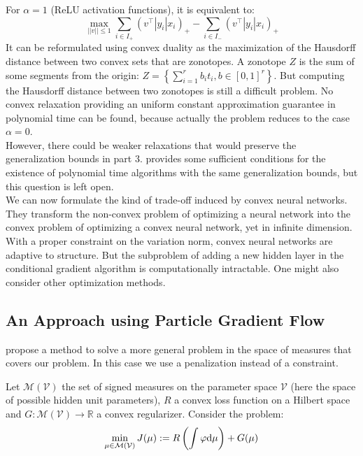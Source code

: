 \documentclass[a4paper, 11pt]{scrartcl}
\begin{document}
{For $\alpha = 1$ (ReLU activation functions), it is equivalent to:
\begin{equation}
\max_{||v|| \leq 1} \sum_{i\in I_+} (v^\top |y_i| x_i )_+  - \sum_{i\in I_-} (v^\top |y_i| x_i )_+
\end{equation}
It can be reformulated using convex duality as the maximization of the Hausdorff distance between two convex sets that are zonotopes. A zonotope $Z$ is the sum of some segments from the origin: $Z = \left\{ \sum_{i=1}^r b_i t_i, b \in [0, 1]^r \right\}$. But computing the Hausdorff distance between two zonotopes is still a difficult problem. No convex relaxation providing an uniform constant approximation guarantee in polynomial time can be found, because actually the problem reduces to the case $\alpha = 0$.\\

However, there could be weaker relaxations that would preserve the generalization bounds in part 3. \cite{bach2017breaking} provides some sufficient conditions for the existence of polynomial time algorithms with the same generalization bounds, but this question is left open.\\

We can now formulate the kind of trade-off induced by convex neural networks. They transform the non-convex problem of optimizing a neural network into the convex problem of optimizing a convex neural network, yet in infinite dimension. With a proper constraint on the variation norm, convex neural networks are adaptive to structure. But the subproblem of adding a new hidden layer in the conditional gradient algorithm is computationally intractable. One might also consider other optimization methods.


\subsection{An Approach using Particle Gradient Flow}

\cite{chizat2018global} propose a method to solve a more general problem in the space of measures that covers our problem. In this case we use a penalization instead of a constraint.

Let $\mathcal{M}(\mathcal{V})$ the set of signed measures on the parameter space $\mathcal{V}$ (here the space of possible hidden unit parameters), $R$ a convex loss function on a Hilbert space and $G:\mathcal{M}(\mathcal{V}) \rightarrow \mathbb{R}$ a convex regularizer. Consider the problem:
\begin{equation}
\min_{\mu \in \mathcal{M}(\mathcal{V})} J(\mu):=R\left( \int \varphi \textnormal{d}\mu \right) + G(\mu)
\end{equation}

}
\end{document}

